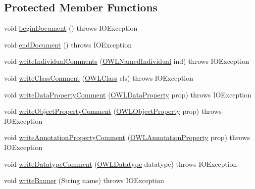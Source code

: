 \subsection*{Protected Member Functions}
\begin{DoxyCompactItemize}
\item 
void \hyperlink{classorg_1_1coode_1_1owlapi_1_1rdf_1_1rdfxml_1_1_r_d_f_x_m_l_renderer_ac0f7bc1efbd4e2892edf7f8a6f6a6640}{begin\-Document} ()  throws I\-O\-Exception 
\item 
void \hyperlink{classorg_1_1coode_1_1owlapi_1_1rdf_1_1rdfxml_1_1_r_d_f_x_m_l_renderer_a7fbc5dfaec0af3bc50f2054cf20be204}{end\-Document} ()  throws I\-O\-Exception 
\item 
void \hyperlink{classorg_1_1coode_1_1owlapi_1_1rdf_1_1rdfxml_1_1_r_d_f_x_m_l_renderer_ad26ae6604d12834f9e129d05fda2bc7a}{write\-Individual\-Comments} (\hyperlink{interfaceorg_1_1semanticweb_1_1owlapi_1_1model_1_1_o_w_l_named_individual}{O\-W\-L\-Named\-Individual} ind)  throws I\-O\-Exception 
\item 
void \hyperlink{classorg_1_1coode_1_1owlapi_1_1rdf_1_1rdfxml_1_1_r_d_f_x_m_l_renderer_a8bdfd5df64b024380f209551c6f42ac8}{write\-Class\-Comment} (\hyperlink{interfaceorg_1_1semanticweb_1_1owlapi_1_1model_1_1_o_w_l_class}{O\-W\-L\-Class} cls)  throws I\-O\-Exception 
\item 
void \hyperlink{classorg_1_1coode_1_1owlapi_1_1rdf_1_1rdfxml_1_1_r_d_f_x_m_l_renderer_a3fae8b7b7f02a96588af50b2bcbf93ad}{write\-Data\-Property\-Comment} (\hyperlink{interfaceorg_1_1semanticweb_1_1owlapi_1_1model_1_1_o_w_l_data_property}{O\-W\-L\-Data\-Property} prop)  throws I\-O\-Exception 
\item 
void \hyperlink{classorg_1_1coode_1_1owlapi_1_1rdf_1_1rdfxml_1_1_r_d_f_x_m_l_renderer_ac965f7b41ec4e69036b142889e4a10a1}{write\-Object\-Property\-Comment} (\hyperlink{interfaceorg_1_1semanticweb_1_1owlapi_1_1model_1_1_o_w_l_object_property}{O\-W\-L\-Object\-Property} prop)  throws I\-O\-Exception 
\item 
void \hyperlink{classorg_1_1coode_1_1owlapi_1_1rdf_1_1rdfxml_1_1_r_d_f_x_m_l_renderer_a1d2eaf4e2a8d79b6562d18708a639f4c}{write\-Annotation\-Property\-Comment} (\hyperlink{interfaceorg_1_1semanticweb_1_1owlapi_1_1model_1_1_o_w_l_annotation_property}{O\-W\-L\-Annotation\-Property} prop)  throws I\-O\-Exception 
\item 
void \hyperlink{classorg_1_1coode_1_1owlapi_1_1rdf_1_1rdfxml_1_1_r_d_f_x_m_l_renderer_aeb63fc9bcc0882fd682aa6bf2d7bb858}{write\-Datatype\-Comment} (\hyperlink{interfaceorg_1_1semanticweb_1_1owlapi_1_1model_1_1_o_w_l_datatype}{O\-W\-L\-Datatype} datatype)  throws I\-O\-Exception 
\item 
void \hyperlink{classorg_1_1coode_1_1owlapi_1_1rdf_1_1rdfxml_1_1_r_d_f_x_m_l_renderer_a8dd4da02a55c494c53945c9b0388ba41}{write\-Banner} (String name)  throws I\-O\-Exception 
\end{DoxyCompactItemize}
